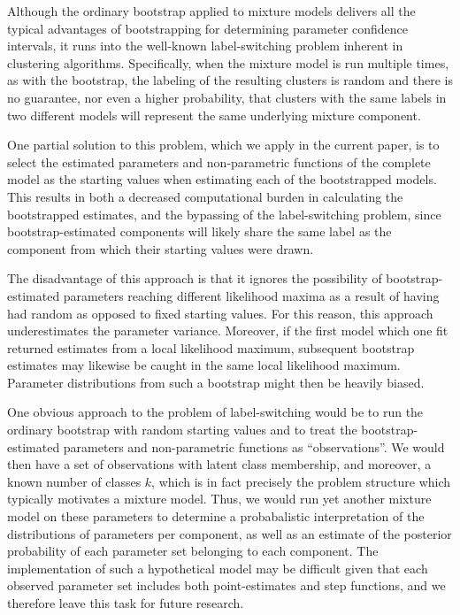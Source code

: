 \documentclass[10pt]{olplainarticle}\usepackage[]{graphicx}\usepackage[]{color}
\begin{document}
Although the ordinary bootstrap applied to mixture models delivers all the typical advantages of bootstrapping for determining parameter confidence intervals, it runs into the well-known label-switching problem inherent in clustering algorithms. Specifically, when the mixture model is run multiple times, as with the bootstrap, the labeling of the resulting clusters is random and there is no guarantee, nor even a higher probability, that clusters with the same labels in two different models will represent the same underlying mixture component.

One partial solution to this problem, which we apply in the current paper, is to select the estimated parameters and non-parametric functions of the complete model as the starting values when estimating each of the bootstrapped models. This results in both a decreased computational burden in calculating the bootstrapped estimates, and the bypassing of the label-switching problem, since bootstrap-estimated components will likely share the same label as the component from which their starting values were drawn.

The disadvantage of this approach is that it ignores the possibility of bootstrap-estimated parameters reaching different likelihood maxima as a result of having had random as opposed to fixed starting values. For this reason, this approach underestimates the parameter variance. Moreover, if the first model which one fit returned estimates from a local likelihood maximum, subsequent bootstrap estimates may likewise be caught in the same local likelihood maximum. Parameter distributions from such a bootstrap might then be heavily biased.

One obvious approach to the problem of label-switching would be to run the ordinary bootstrap with random starting values and to treat the bootstrap-estimated parameters and non-parametric functions as ``observations''. We would then have a set of observations with latent class membership, and moreover, a known number of classes $k$, which is in fact precisely the problem structure which typically motivates a mixture model. Thus, we would run yet another mixture model on these parameters to determine a probabalistic interpretation of the distributions of parameters per component, as well as an estimate of the posterior probability of each parameter set belonging to each component. The implementation of such a hypothetical model may be difficult given that each observed parameter set includes both point-estimates and step functions, and we therefore leave this task for future research.
\end{document}
